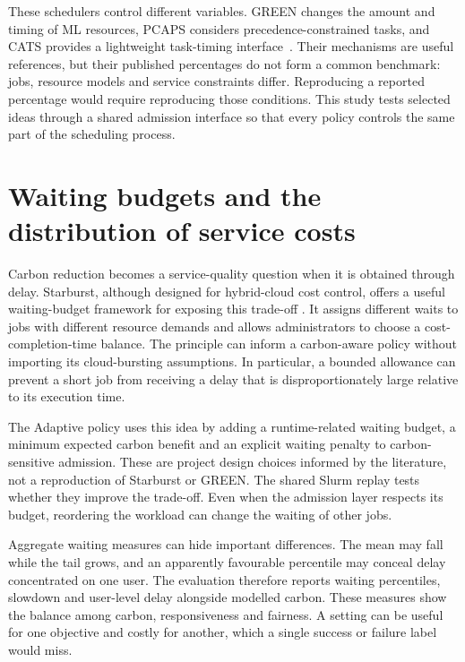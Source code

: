 These schedulers control different variables. GREEN changes the amount and timing of ML resources, PCAPS considers precedence-constrained tasks, and CATS provides a lightweight task-timing interface~\citep{xu2025green,lechowicz2025pcaps,cats2025}. Their mechanisms are useful references, but their published percentages do not form a common benchmark: jobs, resource models and service constraints differ. Reproducing a reported percentage would require reproducing those conditions. This study tests selected ideas through a shared admission interface so that every policy controls the same part of the scheduling process.

\section{Waiting budgets and the distribution of service costs}

Carbon reduction becomes a service-quality question when it is obtained through delay. Starburst, although designed for hybrid-cloud cost control, offers a useful waiting-budget framework for exposing this trade-off \citep{luo2024starburst}. It assigns different waits to jobs with different resource demands and allows administrators to choose a cost-completion-time balance. The principle can inform a carbon-aware policy without importing its cloud-bursting assumptions. In particular, a bounded allowance can prevent a short job from receiving a delay that is disproportionately large relative to its execution time.

The Adaptive policy uses this idea by adding a runtime-related waiting budget, a minimum expected carbon benefit and an explicit waiting penalty to carbon-sensitive admission. These are project design choices informed by the literature, not a reproduction of Starburst or GREEN. The shared Slurm replay tests whether they improve the trade-off. Even when the admission layer respects its budget, reordering the workload can change the waiting of other jobs.

Aggregate waiting measures can hide important differences. The mean may fall while the tail grows, and an apparently favourable percentile may conceal delay concentrated on one user. The evaluation therefore reports waiting percentiles, slowdown and user-level delay alongside modelled carbon. These measures show the balance among carbon, responsiveness and fairness. A setting can be useful for one objective and costly for another, which a single success or failure label would miss.

